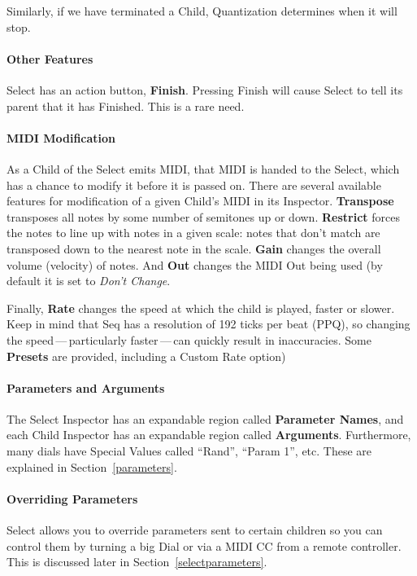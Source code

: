 \documentclass[twoside,10pt]{article}
\begin{document}
Similarly, if we have terminated a Child, Quantization determines when it will stop.

\paragraph{Other Features}

Select has an action button, {\bf Finish}.  Pressing Finish will cause Select to tell its parent that it has Finished.  This is a rare need.


\paragraph{MIDI Modification}

As a Child of the Select emits MIDI, that MIDI is handed to the Select, which has a chance to modify it before it is passed on.  There are several available features for modification of a given Child's MIDI in its Inspector.  {\bf Transpose} transposes all notes by some number of semitones up or down.  {\bf Restrict} forces the notes to line up with notes in a given scale: notes that don't match are transposed down to the nearest note in the scale.  {\bf Gain} changes the overall volume (velocity) of notes.  And {\bf Out} changes the MIDI Out being used (by default it is set to {\it Don't Change}.

Finally, {\bf Rate} changes the speed at which the child is played, faster or slower.  Keep in mind that Seq has a resolution of 192 ticks per beat (PPQ), so changing the speed\,---\,particularly faster\,---\,can quickly result in inaccuracies.    Some {\bf Presets} are provided, including a Custom Rate option)


\paragraph{Parameters and Arguments}

The Select Inspector has an expandable region called {\bf Parameter Names}, and each Child Inspector has an expandable region called {\bf Arguments}. Furthermore, many dials have Special Values called ``Rand'', ``Param 1'', etc.  These are explained in Section~\ref{parameters}.

\paragraph{Overriding Parameters}
Select allows you to override parameters sent to certain children so you can control them by turning a big Dial or via a MIDI CC from a remote controller.  This is discussed later in Section~\ref{selectparameters}.
\end{document}
